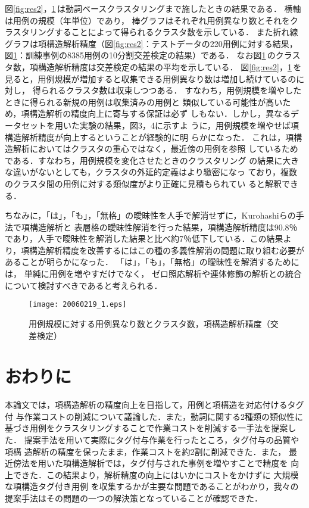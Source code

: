 図\ref{fig:res2}，\ref{fig:res4}\,は動詞ベースクラスタリングまで施したときの結果である．
横軸は用例の規模（年単位）であり，
棒グラフはそれぞれ用例異なり数とそれをクラスタリングすることによって得られるクラスタ数を示している．
また折れ線グラフは項構造解析精度（図\ref{fig:res2}：テストデータの220用例に対する結果，図\ref{fig:res4}：訓練事例の8385用例の10分割交差検定の結果）である．
なお図\ref{fig:res4}\,のクラスタ数，項構造解析精度は交差検定の結果の平均を示している．
図\ref{fig:res2}，\ref{fig:res4}\,を見ると，用例規模が増加すると収集できる用例異なり数は増加し続けているのに対し，
得られるクラスタ数は収束しつつある．
すなわち，用例規模を増やしたときに得られる新規の用例は収集済みの用例と
類似している可能性が高いため，項構造解析の精度向上に寄与する保証は必ず
しもない．しかし，異なるデータセットを用いた実験の結果，図3，4に示すよ
うに，用例規模を増やせば項構造解析精度が向上するということが経験的に明
らかになった．
これは，項構造解析においてはクラスタの重心ではなく，最近傍の用例を参照
しているためである．すなわち，用例規模を変化させたときのクラスタリング
の結果に大きな違いがないとしても，クラスタの外延的定義はより緻密になっ
ており，複数のクラスタ間の用例に対する類似度がより正確に見積もられてい
ると解釈できる．

ちなみに，「は」，「も」，「無格」の曖昧性を人手で解消せずに，Kurohashiら\citeyear{Kurohashi:94}の手法で項構造解析と
表層格の曖昧性解消を行った結果，項構造解析精度は90.8％であり，人手で曖昧性を解消した結果と比べ約7％低下している．この結果より，項構造解析精度を改善するにはこの種の多義性解消の問題に取り組む必要があることが明らかになった．
「は」，「も」，「無格」の曖昧性を解消するためには，
単純に用例を増やすだけでなく，
ゼロ照応解析や連体修飾の解析との統合について検討すべきであると考えられる．

\begin{figure}[t]
\begin{center}
         \texttt{[image: 20060219\_1.eps]}
    \caption{用例規模に対する用例異なり数とクラスタ数，項構造解析精度（交差検定）}
    \label{fig:res4}
\end{center}
\end{figure}




\section{おわりに}
\label{sec:fifth}

本論文では，項構造解析の精度向上を目指して，用例と項構造を対応付けるタグ付
与作業コストの削減について議論した．また，動詞に関する2種類の類似性に
基づき用例をクラスタリングすることで作業コストを削減する一手法を提案し
た．
提案手法を用いて実際にタグ付与作業を行ったところ，タグ付与の品質や項構
造解析の精度を保ったまま，作業コストを約2割に削減できた．また，
最近傍法を用いた項構造解析では，タグ付与された事例を増やすことで精度を
向上できた．この結果より，解析精度の向上にはいかにコストをかけずに
大規模な項構造タグ付き用例
を収集するかが主要な問題であることがわかり，我々の提案手法はその問題の一つの解決策となっていることが確認できた．

